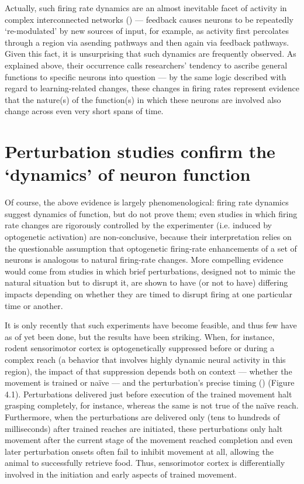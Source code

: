 \begin{refsection}
Actually, such firing rate dynamics are an almost inevitable facet of activity in complex interconnected networks (\cite{pandarinath2018a,yuste2015a}) --- feedback causes neurons to be repeatedly ‘re-modulated’ by new sources of input, for example, as activity first percolates through a region via asending pathways and then again via feedback pathways. Given this fact, it is unsurprising that such dynamics are frequently observed. As explained above, their occurrence calls researchers’ tendency to ascribe general functions to specific neurons into question --- by the same logic described with regard to learning-related changes, these changes in firing rates represent evidence that the nature(s) of the function(s) in which these neurons are involved also change across even very short spans of time.

\section{Perturbation studies confirm the ‘dynamics’ of neuron function}
Of course, the above evidence is largely phenomenological: firing rate dynamics suggest dynamics of function, but do not prove them; even studies in which firing rate changes are rigorously controlled by the experimenter (i.e. induced by optogenetic activation) are non-conclusive, because their interpretation relies on the questionable assumption that optogenetic firing-rate enhancements of a set of neurons is analogous to natural firing-rate changes. More compelling evidence would come from studies in which brief perturbations, designed not to mimic the natural situation but to disrupt it, are shown to have (or not to have) differing impacts depending on whether they are timed to disrupt firing at one particular time or another.

It is only recently that such experiments have become feasible, and thus few have as of yet been done, but the results have been striking. When, for instance, rodent sensorimotor cortex is optogenetically suppressed before or during a complex reach (a behavior that involves highly dynamic neural activity in this region), the impact of that suppression depends both on context --- whether the movement is trained or naïve --- and the perturbation’s precise timing (\cite{guo2015a}) (Figure 4.1). Perturbations delivered just before execution of the trained movement halt grasping completely, for instance, whereas the same is not true of the naïve reach. Furthermore, when the perturbations are delivered only (tens to hundreds of milliseconds) after trained reaches are initiated, these perturbations only halt movement after the current stage of the movement reached completion and even later perturbation onsets often fail to inhibit movement at all, allowing the animal to successfully retrieve food. Thus, sensorimotor cortex is differentially involved in the initiation and early aspects of trained movement.


\end{refsection}
